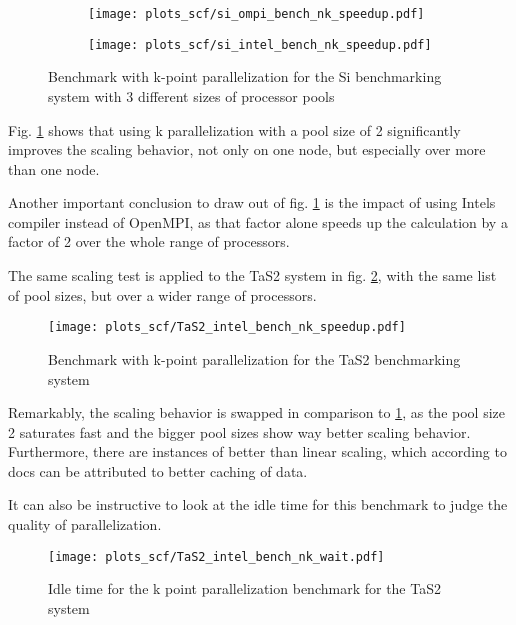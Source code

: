 \documentclass[main.tex]{subfiles}
\begin{document}
\begin{figure}[ht!]
\begin{subfigure}[b]{0.49\textwidth}
    \centering
    \texttt{[image: plots\_scf/si\_ompi\_bench\_nk\_speedup.pdf]}
\end{subfigure}
\begin{subfigure}[b]{0.49\textwidth}
    \centering
    \texttt{[image: plots\_scf/si\_intel\_bench\_nk\_speedup.pdf]}
\end{subfigure}
\caption{Benchmark with k-point parallelization for the Si benchmarking system with 3 different sizes of processor pools}
\label{fig:scaling_nk_si}
\end{figure}

Fig. \ref{fig:scaling_nk_si} shows that using k parallelization with a pool size of 2 significantly improves the scaling behavior, not only on one node, but especially over more than one node.


Another important conclusion to draw out of fig. \ref{fig:scaling_nk_si} is the impact of using Intels compiler instead of OpenMPI, as that factor alone speeds up the calculation by a factor of 2 over the whole range of processors.

The same scaling test is applied to the TaS2 system in fig. \ref{fig:scaling_nk_tas2}, with the same list of pool sizes, but over a wider range of processors.

\begin{figure}[ht!]
    \centering
    \texttt{[image: plots\_scf/TaS2\_intel\_bench\_nk\_speedup.pdf]}
    \caption{Benchmark with k-point parallelization for the TaS2 benchmarking system}
    \label{fig:scaling_nk_tas2}
\end{figure}

Remarkably, the scaling behavior is swapped in comparison to \ref{fig:scaling_nk_si}, as the pool size 2 saturates fast and the bigger pool sizes show way better scaling behavior.
Furthermore, there are instances of better than linear scaling, which according to \QE docs can be attributed to better caching of data.

It can also be instructive to look at the idle time for this benchmark to judge the quality of parallelization. 

\begin{figure}[ht!]
    \centering
    \texttt{[image: plots\_scf/TaS2\_intel\_bench\_nk\_wait.pdf]}
    \caption{Idle time for the k point parallelization benchmark for the TaS2 system}
    \label{fig:scaling_nk_tas2_wait}
\end{figure}
\end{document}
